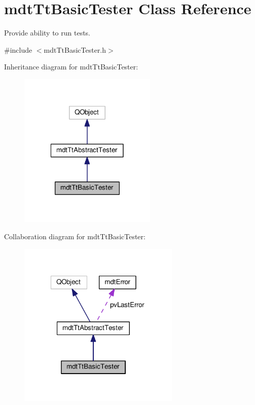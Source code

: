 \hypertarget{classmdt_tt_basic_tester}{\section{mdt\-Tt\-Basic\-Tester Class Reference}
\label{classmdt_tt_basic_tester}
}


Provide ability to run tests.  




{\ttfamily \#include $<$mdt\-Tt\-Basic\-Tester.\-h$>$}



Inheritance diagram for mdt\-Tt\-Basic\-Tester\-:
\nopagebreak
\begin{figure}[H]
\begin{center}
\leavevmode
\includegraphics[width=186pt]{classmdt_tt_basic_tester__inherit__graph}
\end{center}
\end{figure}


Collaboration diagram for mdt\-Tt\-Basic\-Tester\-:
\nopagebreak
\begin{figure}[H]
\begin{center}
\leavevmode
\includegraphics[width=218pt]{classmdt_tt_basic_tester__coll__graph}
\end{center}
\end{figure}
